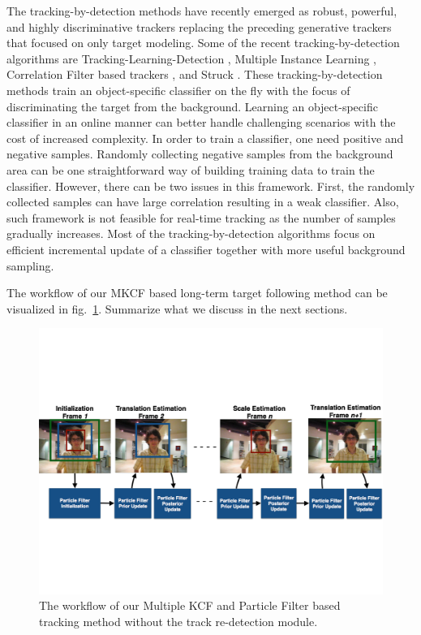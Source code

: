 \documentclass[10pt,twocolumn,letterpaper]{article}
\newcounter{ct}
\begin{document}
The tracking-by-detection methods have recently emerged as robust,
powerful, and highly discriminative trackers replacing the preceding
generative trackers that focused on only target modeling. Some of the
recent tracking-by-detection algorithms are
Tracking-Learning-Detection \cite{kalal2012tracking}, Multiple
Instance Learning \cite{babenko2009visual}, Correlation Filter based
trackers \cite{bolme2010visual,henriques2015high}, and Struck
\cite{hare2012efficient}. These tracking-by-detection methods train an
object-specific classifier on the fly with the focus of discriminating
the target from the background. Learning an object-specific classifier
in an online manner can better handle challenging scenarios with the
cost of increased complexity. In order to train a classifier, one need
positive and negative samples. Randomly collecting negative samples
from the background area can be one straightforward way of building
training data to train the classifier. However, there can be two
issues in this framework. First, the randomly collected samples can
have large correlation resulting in a weak classifier. Also, such
framework is not feasible for real-time tracking as the number of
samples gradually increases. Most of the tracking-by-detection
algorithms focus on efficient incremental update of a classifier
together with more useful background sampling.

The workflow of our MKCF based long-term target following method can be visualized in fig.~\ref{Workflow_figure}. Summarize what we discuss in the next sections.
\begin{figure}[!t]
\includegraphics[width=\textwidth]{figures/Workflow_MKCF+PF.pdf}
\caption{The workflow of our Multiple KCF and Particle Filter based tracking method without the track re-detection module.}
\label{Workflow_figure}
\end{figure}
\end{document}

